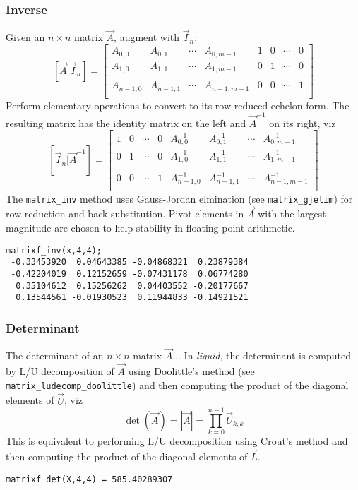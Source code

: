 \subsubsection{Inverse}
Given an $n \times n$ matrix $\vec{A}$, augment with $\vec{I}_n$:
\[
    \left[\vec{A}|\vec{I}_n\right] = 
    \left[
    \begin{array}{cccc|cccc}
    A_{0,0}     & A_{0,1}   & \cdots  & A_{0,m-1}   & 1 & 0 & \cdots & 0 \\
    A_{1,0}     & A_{1,1}   & \cdots  & A_{1,m-1}   & 0 & 1 & \cdots & 0 \\
                &           &         &             &   &   &        &   \\
    A_{n-1,0}   & A_{n-1,1} & \cdots  & A_{n-1,m-1} & 0 & 0 & \cdots & 1 \\
    \end{array}
    \right]
\]
Perform elementary operations to convert to its row-reduced echelon form.
The resulting matrix has the identity matrix on the left and $\vec{A}^{-1}$ on
its right, viz
\[
    \left[\vec{I}_n|\vec{A}^{-1}\right] = 
    \left[
    \begin{array}{cccc|cccc}
1 & 0 & \cdots & 0 & A^{-1}_{0,0}   & A^{-1}_{0,1}   & \cdots  & A^{-1}_{0,m-1}   \\
0 & 1 & \cdots & 0 & A^{-1}_{1,0}   & A^{-1}_{1,1}   & \cdots  & A^{-1}_{1,m-1}   \\
  &   &        &   &                &                &         &                  \\
0 & 0 & \cdots & 1 & A^{-1}_{n-1,0} & A^{-1}_{n-1,1} & \cdots  & A^{-1}_{n-1,m-1} \\
    \end{array}
    \right]
\]
The {\tt matrix\_inv} method uses Gauss-Jordan elmination (see 
{\tt matrix\_gjelim}) for row reduction and back-substitution.
Pivot elements in $\vec{A}$ with the largest magnitude are chosen to help
stability in floating-point arithmetic.
\begin{verbatim}
matrixf_inv(x,4,4);
 -0.33453920  0.04643385 -0.04868321  0.23879384
 -0.42204019  0.12152659 -0.07431178  0.06774280
  0.35104612  0.15256262  0.04403552 -0.20177667
  0.13544561 -0.01930523  0.11944833 -0.14921521
\end{verbatim}

\subsubsection{Determinant}
The determinant of an $n \times n$ matrix $\vec{A}$...
In {\it liquid}, the determinant is computed by L/U decomposition of $\vec{A}$
using Doolittle's method (see {\tt matrix\_ludecomp\_doolittle}) and then
computing the product of the diagonal elements of $\vec{U}$, viz
\[
    \det\left(\vec{A}\right) =
    \left|\vec{A}\right| =
    \prod_{k=0}^{n-1}{\vec{U}_{k,k}}
\]
This is equivalent to performing L/U decomposition using Crout's method and
then computing the product of the diagonal elements of $\vec{L}$.
\begin{verbatim}
matrixf_det(X,4,4) = 585.40289307
\end{verbatim}

